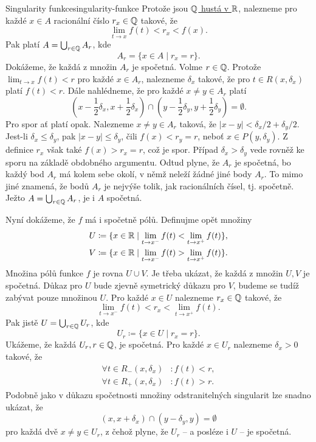 \begin{example}{Singularity funkce}{singularity-funkce}
 Protože jsou \hyperref[cor:hustota-q-v-r]{$\mathbb{Q}$ hustá v $\mathbb{R}$}, nalezneme pro
 každé $x \in A$ racionální číslo $r_x \in \mathbb{Q}$ takové, že
 \[
  \lim_{t \to x} f(t) < r_x < f(x).
 \]
 Pak platí $A = \bigcup_{r \in \mathbb{Q}} A_r$, kde
 \[
  A_r = \{x \in A \mid r_x = r\}.
 \]
 Dokážeme, že každá z množin $A_r$ je spočetná. Volme $r \in \mathbb{Q}$. Protože
 $\lim_{t \to x} f(t) < r$ pro každé $x \in A_r$, nalezneme $\delta_x$ takové,
 že pro $t \in R(x,\delta_x)$ platí $f(t) < r$. Dále nahlédneme, že pro každé
 $x \neq y \in A_r$ platí
 \[
  (x - \frac{1}{2}\delta_x, x + \frac{1}{2}\delta_x) \cap
  (y-\frac{1}{2}\delta_y,y+\frac{1}{2}\delta_y) = \emptyset.
 \]
 Pro spor ať platí opak. Nalezneme $x \neq y \in A_r$ taková, že $|x-y|<\delta_x
 / 2 + \delta_y / 2$. Jest-li $\delta_x \leq \delta_y$, pak $|x-y| \leq
 \delta_y$, čili $f(x) < r_y = r$, neboť $x \in P(y,\delta_y)$. Z definice $r_x$
 však také $f(x) > r_x = r$, což je spor. Případ $\delta_x > \delta_y$ vede
 rovněž ke sporu na základě obdobného argumentu. Odtud plyne, že $A_r$ je
 spočetná, bo každý bod $A_r$ má kolem sebe okolí, v němž neleží žádné jiné body
 $A_r$. To mimo jiné znamená, že bodů $A_r$ je nejvýše tolik, jak racionálních
 čísel, tj. spočetně. Ježto $A = \bigcup_{r \in \mathbb{Q}} A_r$, je i $A$ spočetná.

 Nyní dokážeme, že $f$ má i spočetně pólů. Definujme opět množiny
 \begin{align*}
  U &\coloneqq \{x \in \mathbb{R} \mid \lim_{t \to x^{-}} f(t) < \lim_{t \to x^{+}}
  f(t)\},\\
   V &\coloneqq \{x \in \mathbb{R} \mid \lim_{t \to x^{-}} f(t) > \lim_{t \to x^{+}}
   f(t)\}.
 \end{align*}
 Množina pólů funkce $f$ je rovna $U \cup V$. Je třeba ukázat, že každá z množin
 $U,V$ je spočetná. Důkaz pro $U$ bude zjevně symetrický důkazu pro $V$, budeme
 se tudíž zabývat pouze množinou $U$. Pro každé $x \in U$ nalezneme $r_x \in \mathbb{Q}$
 takové, že
 \[
  \lim_{t \to x^{-}} f(t) < r_x < \lim_{t \to x^{+}} f(t).
 \]
 Pak jistě $U = \bigcup_{r \in \mathbb{Q}} U_r$, kde
 \[
  U_r \coloneqq \{x \in U \mid r_x = r\}.
 \]
 Ukážeme, že každá $U_r,r \in \mathbb{Q}$, je spočetná. Pro každé $x \in U_r$ nalezneme
 $\delta_x>0$ takové, že
 \begin{align*}
  \forall t \in R_-(x,\delta_x)&: f(t) < r,\\
  \forall t \in R_+(x,\delta_x)&:f(t) > r.
 \end{align*}
 Podobně jako v důkazu spočetnosti množiny odstranitelných singularit lze snadno
 ukázat, že
 \[
  (x,x+\delta_x) \cap (y-\delta_y,y) = \emptyset
 \]
 pro každá dvě $x \neq y \in U_r$, z čehož plyne, že $U_r$ -- a posléze i $U$ --
 je spočetná.
\end{example}
